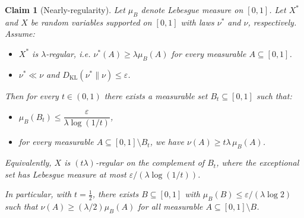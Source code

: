 \documentclass[10pt,a4paper]{amsart}
\newtheorem{claim}[theorem]{Claim}
\begin{document}
\begin{claim}[Nearly-regularity]
\label{cla:kl-regularity}
Let $\mu_B$ denote Lebesgue measure on $[0,1]$. Let $X^*$ and $X$ be random variables supported on $[0,1]$ with laws $\nu^*$ and $\nu$, respectively. Assume:
\begin{itemize}
  \item $X^*$ is $\lambda$-regular, i.e. $\nu^*(A) \ge \lambda \mu_B(A)$ for every measurable $A\subseteq[0,1]$.
  \item $\nu^*\ll \nu$ and $D_{\mathrm{KL}}(\nu^*\|\nu)\le \varepsilon$.
\end{itemize}
Then for every $t\in(0,1)$ there exists a measurable set $B_t\subseteq[0,1]$ such that:
\begin{itemize}
  \item $\mu_B(B_t)\le \dfrac{\varepsilon}{\lambda \log(1/t)}$,
  \item for every measurable $A\subseteq [0,1]\setminus B_t$, we have $\nu(A)\ge t\lambda\,\mu_B(A)$.
\end{itemize}
Equivalently, $X$ is $(t\lambda)$-regular on the complement of $B_t$, where the exceptional set has Lebesgue measure at most $\varepsilon/(\lambda\log(1/t))$.

In particular, with $t=\tfrac12$, there exists $B\subseteq[0,1]$ with $\mu_B(B)\le \varepsilon/(\lambda\log 2)$ such that $\nu(A)\ge (\lambda/2)\mu_B(A)$ for all measurable $A\subseteq[0,1]\setminus B$.
\end{claim}
\end{document}
